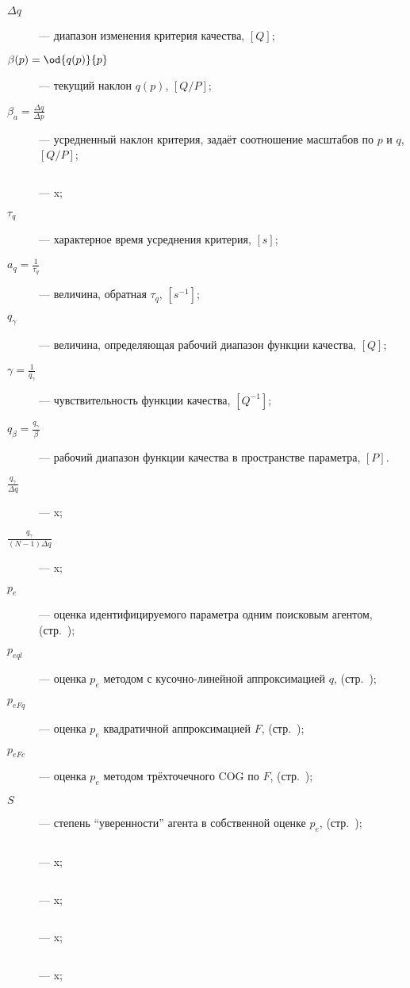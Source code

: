 \begin{description}
  \item[$\Delta q$]  --- диапазон изменения критерия качества, $[Q]$;

  \item[$\beta(p) = \od{q(p)}{p}$]  --- текущий наклон $q(p)$, $[Q/P]$;

  \item[$\beta_a = \frac{\Delta q}{\Delta p} $]  --- усредненный наклон критерия, задаёт соотношение масштабов по $p$ и $q$, $[Q/P]$;

  \item[$ $]  --- x;

  \item[$\tau_q$]  --- характерное время усреднения критерия, $[s]$;

  \item[$a_q = \frac{1}{\tau_q} $]  --- величина, обратная $\tau_q$, $[s^{-1}]$;

  \item[$q_\gamma $]  --- величина, определяющая рабочий диапазон функции качества, $[Q]$;

  \item[$\gamma = \frac{1}{q_\gamma} $]  --- чувствительность функции качества, $[Q^{-1}]$;

  \item[$q_\beta = \frac{q_\gamma}{\beta} $]  --- рабочий диапазон функции качества в пространстве параметра, $[P]$.

  \item[$\frac{q_\gamma}{\Delta q} $]  --- x;

  \item[$\frac{q_\gamma}{(N-1)\Delta q} $]  --- x;

  \item[$p_{e} $]  --- оценка идентифицируемого параметра одним поисковым агентом, (стр.~\pageref{atu:d:p_e});

  \item[$p_{eql} $]  --- оценка $p_e$ методом с кусочно-линейной аппроксимацией $q$, (стр.~\pageref{atu:d:p_eql});

  \item[$p_{eFq} $]  --- оценка $p_e$ квадратичной аппроксимацией $F$, (стр.~\pageref{atu:eq:p_eFq});

  \item[$p_{eFc} $]  --- оценка $p_e$ методом трёхточечного COG по $F$, (стр.~\pageref{atu:eq:p_eFc});

  \item[$S$]  --- степень ``уверенности'' агента в собственной оценке $p_e$, (стр.~\pageref{atu:d:S});

  \item[$ $]  --- x;

  \item[$ $]  --- x;

  \item[$ $]  --- x;

  \item[$ $]  --- x;


\end{description}



